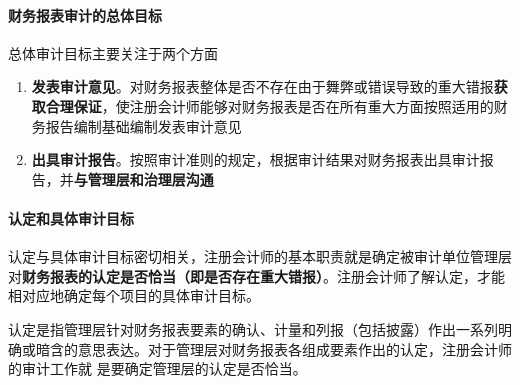 \documentclass[UTF8,12pt]{ctexart}
\numberwithin{equation}{section} %
\numberwithin{figure}{section}
\numberwithin{table}{section}
\begin{document}
	\paragraph{财务报表审计的总体目标}
	总体审计目标主要关注于两个方面
	\begin{enumerate}
		\item \textbf{发表审计意见}。对财务报表整体是否不存在由于舞弊或错误导致的重大错报\textbf{获取合理保证}，使注册会计师能够对财务报表是否在所有重大方面按照适用的财务报告编制基础编制发表审计意见
		
		\item \textbf{出具审计报告}。按照审计准则的规定，根据审计结果对财务报表出具审计报告，并\textbf{与管理层和治理层沟通}
	\end{enumerate}
	
	
	\paragraph{认定和具体审计目标}
	
	认定与具体审计目标密切相关，注册会计师的基本职责就是确定被审计单位管理层对\textbf{财务报表的认定是否恰当（即是否存在重大错报）}。注册会计师了解认定，才能相对应地确定每个项目的具体审计目标。
	
	认定是指管理层针对财务报表要素的确认、计量和列报（包括披露）作出一系列明确或暗含的意思表达。对于管理层对财务报表各组成要素作出的认定，注册会计师的审计工作就
	是要确定管理层的认定是否恰当。
	
\end{document}
